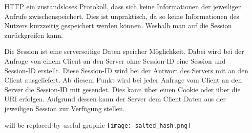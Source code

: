 \documentclass[11pt]{article}
\newcommand{\hlnote}[2]{#1}
\newcommand{\hlnote}[2]{\todo{#2}\texthl{#1}}
\begin{document}
		\begin{flushleft}
			HTTP ein zustandsloses Protokoll, dass sich keine Informationen der jeweiligen Aufrufe zwischenspeichert. Dies ist unpraktisch, da so keine Informationen des Nutzers kurzzeitig gespeichert werden können. \hlnote{Weshalb}{Am Satzanfang holprig} man auf die Session zurückgreifen kann. \par\bigskip


			Die Session ist eine serverseitige Daten \hlnote{speicher Möglichkeit}{Typo}. Dabei wird bei der Anfrage von einem Client an den Server ohne Session-ID eine Session und Session-ID erstellt. Diese Session-ID wird bei der Antwort des Servers mit an den Client ausgeliefert. Ab diesem Punkt wird bei jeder Anfrage vom Client an den Server die Session-ID mit gesendet. Dies kann über einen Cookie oder über die URI erfolgen. Aufgrund dessen kann der Server dem Client Daten aus der jeweiligen Session zur Verfügung stellen.

			\begin{center}
				will be replaced by useful graphic
				\texttt{[image: salted\_hash.png]}
			\end{center}

		\end{flushleft}
\end{document}
